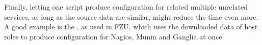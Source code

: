 \documentclass[deska]{subfiles}
\begin{document}
Finally, letting one script produce configuration for related multiple unrelated services, as long as the source data
are similar, might reduce the time even more.  A good example is the , as
used in FZU, which uses the downloaded data of host roles to produce configuration for Nagios, Munin and Ganglia at
once.
\end{document}
